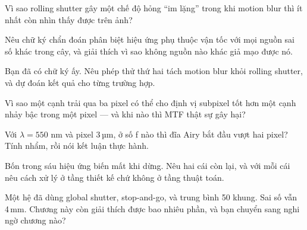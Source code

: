 \documentclass[../../marker.tex]{subfiles}
\begin{document}
\begin{tukiem}
\item Vì sao rolling shutter gây một chế độ hỏng ``im lặng'' trong khi motion blur thì ít nhất còn nhìn thấy được trên ảnh?
\item Nêu chữ ký chẩn đoán phân biệt hiệu ứng phụ thuộc vận tốc với mọi nguồn sai số khác trong cây, và giải thích vì sao không nguồn nào khác giả mạo được nó.
\item Bạn đã có chữ ký ấy. Nêu phép thử thứ hai tách motion blur khỏi rolling shutter, và dự đoán kết quả cho từng trường hợp.
\item Vì sao một cạnh trải qua ba pixel có thể cho định vị subpixel tốt hơn một cạnh nhảy bậc trong một pixel --- và khi nào thì MTF thật sự gây hại?
\item Với \(\lambda = 550\) nm và pixel 3\,µm, ở số f nào thì đĩa Airy bắt đầu vượt hai pixel? Tính nhẩm, rồi nói kết luận thực hành.
\item Bốn trong sáu hiệu ứng biến mất khi dừng. Nêu hai cái còn lại, và với mỗi cái nêu cách xử lý ở tầng thiết kế chứ không ở tầng thuật toán.
\item Một hệ đã dùng global shutter, stop-and-go, và trung bình 50 khung. Sai số vẫn 4\,mm. Chương này còn giải thích được bao nhiêu phần, và bạn chuyển sang nghi ngờ chương nào?
\end{tukiem}
\ifSubfilesClassLoaded{\printbibliography[title={Nguồn}]}{}
\end{document}
